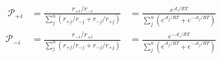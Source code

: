 \begin{eqnarray}\
{\mathcal P}_{+i}  & =  \frac{r_{+i}/r_{-i}}{\sum_j^n\left(r_{+j}/r_{-j} + r_{-j}/r_{+j}  \right)} & =  \frac{e^{\mathcal A_i/RT}}{\sum_j^n \left( e^{\mathcal A_j/RT} + e^{-\mathcal A_j/RT}\right)} \\
{\mathcal P}_{-i}  & =  \frac{r_{-i}/r_{+i}}{\sum_j^n\left(r_{+j}/r_{-j} + r_{-j}/r_{+j}  \right)} & =  \frac{e^{-\mathcal A_i/RT}}{\sum_j^n \left(e^{\mathcal A_j/RT} + e^{-\mathcal A_j/RT}\right)} \\
\end{eqnarray}